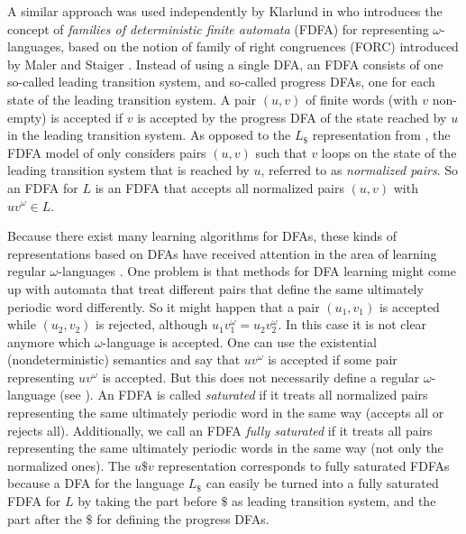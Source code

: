 \documentclass[a4paper,USenglish,cleveref,autoref,thm-restate]{lipics-v2021}
\begin{document}
A similar approach was used independently by Klarlund in \cite{Klarlund94} who introduces the concept of \emph{families of deterministic finite automata} (FDFA) for representing $\omega$-languages, based on the notion of family of right congruences (FORC) introduced by Maler and Staiger \cite{MalerS97}. Instead of using a single DFA, an FDFA consists of one so-called leading transition system, and so-called progress DFAs, one for each state of the leading transition system.
A pair $(u,v)$ of finite words (with $v$ non-empty) is accepted if $v$ is accepted by the progress DFA of the state reached by $u$ in the leading transition system. As opposed to the $L_\$$ representation from \cite{CalbrixNP93}, the FDFA model of \cite{Klarlund94,MalerS97} only considers pairs $(u,v)$ such that $v$ loops on the state of the leading transition system that is reached by $u$, referred to as \emph{normalized pairs}. So an FDFA for $L$ is an FDFA that accepts all normalized pairs $(u,v)$ with $uv^\omega \in L$. 

Because there exist many learning algorithms for DFAs, these kinds of representations based on DFAs have received attention in the area of learning regular $\omega$-languages
\cite{FarzanCCTW08,AngluinF16,LiCZL21,BohnL22,BohnL24,LiST24}. 
One problem is that methods for DFA learning might come up with automata that treat different pairs that define the same ultimately periodic word differently. So it might happen that a pair $(u_1,v_1)$ is accepted while $(u_2,v_2)$ is rejected, although $u_1v_1^\omega = u_2v_2^\omega$. In this case it is not clear anymore which $\omega$-language is accepted. One can use the existential (nondeterministic) semantics and say that $uv^\omega$ is accepted if some pair representing $uv^\omega$ is accepted. But this does not necessarily define a regular $\omega$-language (see \cite[Example 2]{LiCZL21}).
An FDFA is called \emph{saturated} if it treats all normalized pairs representing the same ultimately periodic word in the same way (accepts all or rejects all). Additionally, we call an FDFA \emph{fully saturated} if it treats all pairs representing the same ultimately periodic words in the same way (not only the normalized ones). The $u\$v$ representation corresponds to fully saturated FDFAs because a DFA for the language $L_\$$ can easily be turned into a fully saturated FDFA for $L$ by taking the part before $\$$ as leading transition system, and the part after the $\$$ for defining the progress DFAs.
\end{document}
